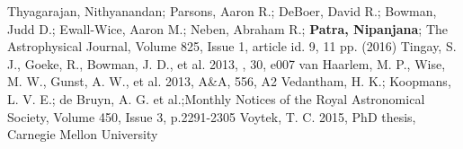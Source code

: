 \documentclass[12pt]{amsart}
\begin{document}
\begin{thebibliography}{}
Thyagarajan, Nithyanandan; Parsons, Aaron R.; DeBoer, David R.; Bowman, Judd D.; Ewall-Wice, Aaron M.; Neben, Abraham R.; {\bf \color{blue}Patra, Nipanjana}; The Astrophysical Journal, Volume 825, Issue 1, article id. 9, 11 pp. (2016)
Tingay, S. J., Goeke, R., Bowman, J. D., et al. 2013, , 30, e007
van Haarlem, M. P., Wise, M. W., Gunst, A. W., et al. 2013,
A\&A, 556, A2
Vedantham, H. K.; Koopmans, L. V. E.; de Bruyn, A. G. et al.;Monthly Notices of the Royal Astronomical Society, Volume 450, Issue 3, p.2291-2305
Voytek, T. C. 2015, PhD thesis, Carnegie Mellon University




\end{thebibliography}

%
\end{document}
